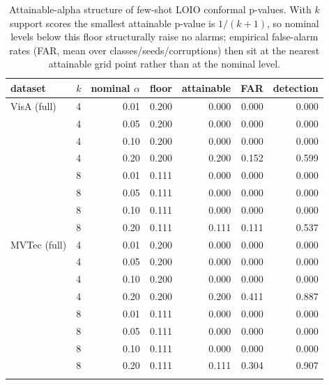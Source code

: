 \begin{table}[t]
\centering
\caption{Attainable-alpha structure of few-shot LOIO conformal p-values. With $k$ support scores the smallest attainable p-value is $1/(k{+}1)$, so nominal levels below this floor structurally raise no alarms; empirical false-alarm rates (FAR, mean over classes/seeds/corruptions) then sit at the nearest attainable grid point rather than at the nominal level.}
\label{tab:attainable-alpha}
\footnotesize
\setlength{\tabcolsep}{3pt}
\begin{tabular}{llrrrrr}
\toprule
dataset & $k$ & nominal $\alpha$ & floor & attainable & FAR & detection \\
\midrule
VisA (full) & 4 & 0.01 & 0.200 & 0.000 & 0.000 & 0.000 \\
 & 4 & 0.05 & 0.200 & 0.000 & 0.000 & 0.000 \\
 & 4 & 0.10 & 0.200 & 0.000 & 0.000 & 0.000 \\
 & 4 & 0.20 & 0.200 & 0.200 & 0.152 & 0.599 \\
 & 8 & 0.01 & 0.111 & 0.000 & 0.000 & 0.000 \\
 & 8 & 0.05 & 0.111 & 0.000 & 0.000 & 0.000 \\
 & 8 & 0.10 & 0.111 & 0.000 & 0.000 & 0.000 \\
 & 8 & 0.20 & 0.111 & 0.111 & 0.111 & 0.537 \\
\addlinespace[2pt]
MVTec (full) & 4 & 0.01 & 0.200 & 0.000 & 0.000 & 0.000 \\
 & 4 & 0.05 & 0.200 & 0.000 & 0.000 & 0.000 \\
 & 4 & 0.10 & 0.200 & 0.000 & 0.000 & 0.000 \\
 & 4 & 0.20 & 0.200 & 0.200 & 0.411 & 0.887 \\
 & 8 & 0.01 & 0.111 & 0.000 & 0.000 & 0.000 \\
 & 8 & 0.05 & 0.111 & 0.000 & 0.000 & 0.000 \\
 & 8 & 0.10 & 0.111 & 0.000 & 0.000 & 0.000 \\
 & 8 & 0.20 & 0.111 & 0.111 & 0.304 & 0.907 \\
\addlinespace[2pt]
\bottomrule
\end{tabular}
\end{table}

